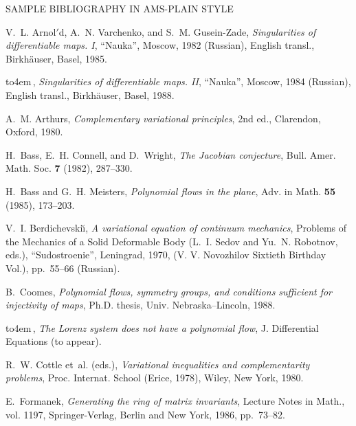 \documentclass[12pt]{article}
\begin{document}
\thispagestyle{plain} 



\centerline{SAMPLE BIBLIOGRAPHY IN AMS-PLAIN STYLE}
\vspace{2pc}

\makeatletter \renewcommand{\@biblabel}[1]{\hfill#1.}\makeatother
\newcommand{\bysame}{\leavevmode\hbox to4em{\hrulefill}\,}


\begin{thebibliography}{10}

V.~L. Arnol$'$d, A.~N. Varchenko, and S.~M. Gusein-Zade, 
  {\em Singularities of differentiable maps. {\rm I}},
 ``Nauka'', Moscow, 1982 (Russian), English
  transl., Birkh\"auser, Basel, 1985.

\bysame, {\em Singularities of differentiable maps. {\rm II}},
 ``Nauka'',  Moscow, 1984 (Russian), English transl.,
 Birkh\"auser, Basel, 1988.

A.~M. Arthurs, 
 {\em Complementary variational principles}, 2nd ed.,
 Clarendon, Oxford, 1980.

H.~Bass, E.~H. Connell, and D.~Wright, 
  {\em The {J}acobian conjecture},
 Bull. Amer. Math. Soc. {\bf 7} (1982), 287--330.

H.~Bass and G.~H. Meisters, 
   {\em Polynomial flows in the plane},
   Adv. in Math. {\bf 55} (1985), 173--203.

V.~I. Berdichevski\u\i, 
  {\em A variational equation of continuum mechanics}, 
 Problems of the Mechanics of a Solid Deformable Body 
(L.~I. Sedov and Yu.~N. Robotnov, eds.), 
 ``Sudostroenie'', Leningrad, 1970,
 (V. V. Novozhilov   Sixtieth Birthday Vol.),
 pp.~55--66 (Russian).

B.~Coomes,
 {\em Polynomial flows, symmetry groups, and conditions sufficient
  for injectivity of maps},
 Ph.D. thesis, Univ. Nebraska--Lincoln, 1988.

\bysame, 
{\em The {L}orenz system does not have a polynomial flow},
 J. Differential Equations (to appear).



R.~W. Cottle et~al. (eds.),
 {\em Variational inequalities and complementarity problems},
 Proc. Internat. School (Erice, 1978), Wiley, New York, 1980.

E.~Formanek, 
 {\em Generating the ring of matrix invariants},
 Lecture Notes in Math., vol. 1197,
 Springer-Verlag, Berlin and New York, 1986, pp.~73--82.


\end{thebibliography}
\end{document}
